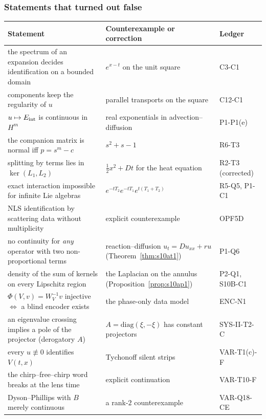 \subsubsection{Statements that turned out false}

\begin{center}\small
\begin{tabular}{@{}L{5.2cm}L{6.0cm}L{2.6cm}@{}}
\toprule
Statement & Counterexample or correction & Ledger\\\midrule
the spectrum of an expansion decides identification on a bounded domain & $e^{x-t}$ on the unit square & C3-C1\\
components keep the regularity of $u$ & parallel transports on the square & C12-C1\\
$u\mapsto E_{\mathrm{int}}$ is continuous in $H^m$ & real exponentials in advection--diffusion & P1-P1(e)\\
the companion matrix is normal iff $p=s^m-c$ & $s^2+s-1$ & R6-T3\\
splitting by terms lies in $\ker(L_1,L_2)$ & $\tfrac12x^2+Dt$ for the heat equation & R2-T3 (corrected)\\
exact interaction impossible for infinite Lie algebras & $e^{-tT_2}e^{-tT_1}e^{t(T_1+T_2)}$ & R5-Q5, P1-C1\\
NLS identification by scattering data without multiplicity & explicit counterexample & OPF5D\\
no continuity for \emph{any} operator with two non-proportional terms & reaction--diffusion $u_t=Du_{xx}+ru$ (Theorem~\ref{thm:s10at1}) & P1-Q6\\
density of the sum of kernels on every Lipschitz region & the Laplacian on the annulus (Proposition~\ref{prop:s10ap1}) & P2-Q1, S10B-C1\\
$\Phi(V,v)=W_V^{-1}v$ injective $\iff$ a blind encoder exists & the phase-only data model & ENC-N1\\
an eigenvalue crossing implies a pole of the projector (derogatory $A$) & $A=\mathrm{diag}(\xi,-\xi)$ has constant projectors & SYS-II-T2-C\\
every $u\not\equiv0$ identifies $V(t,x)$ & Tychonoff silent strips & VAR-T1(c)-F\\
the chirp--free--chirp word breaks at the lens time & explicit continuation & VAR-T10-F\\
Dyson--Phillips with $B$ merely continuous & a rank-$2$ counterexample & VAR-Q18-CE\\\bottomrule
\end{tabular}
\end{center}

